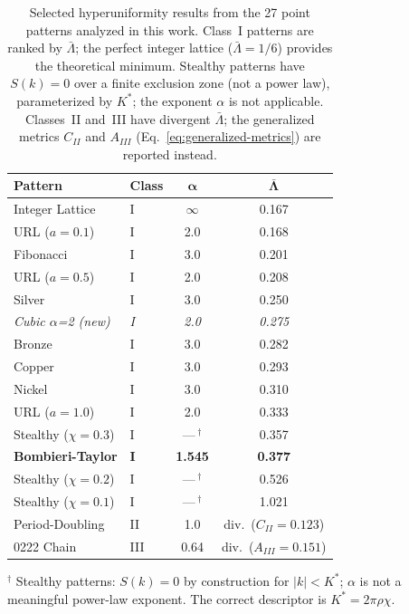 \documentclass[11pt]{article}
\begin{document}
\begin{table}[H]
  \centering
  \caption{Selected hyperuniformity results from the 27 point patterns analyzed in this work.
  Class~I patterns are ranked by $\bar{\Lambda}$; the perfect integer lattice ($\bar{\Lambda}
  = 1/6$) provides the theoretical minimum. Stealthy patterns have $S(k)=0$ over a finite
  exclusion zone (not a power law), parameterized by $K^*$; the exponent $\alpha$ is not
  applicable. Classes~II and~III have divergent $\bar{\Lambda}$; the generalized metrics
  $C_{II}$ and $A_{III}$ (Eq.~\ref{eq:generalized-metrics}) are reported instead.}
  \label{tab:catalog}
  \begin{tabular}{llcc}
    \toprule
    \textbf{Pattern} & \textbf{Class} & $\boldsymbol{\alpha}$ & $\boldsymbol{\bar{\Lambda}}$ \\
    \midrule
    Integer Lattice              & I   & $\infty$ & 0.167 \\
    URL ($a = 0.1$)              & I   & 2.0      & 0.168 \\
    Fibonacci                    & I   & 3.0      & 0.201 \\
    URL ($a = 0.5$)              & I   & 2.0      & 0.208 \\
    Silver                       & I   & 3.0      & 0.250 \\
    \textit{Cubic $\alpha$=2 (new)} & \textit{I} & \textit{2.0} & \textit{0.275} \\
    Bronze                       & I   & 3.0      & 0.282 \\
    Copper                       & I   & 3.0      & 0.293 \\
    Nickel                       & I   & 3.0      & 0.310 \\
    URL ($a = 1.0$)              & I   & 2.0      & 0.333 \\
    Stealthy ($\chi = 0.3$)      & I   & ---\,$^\dagger$ & 0.357 \\
    \textbf{Bombieri-Taylor}     & \textbf{I} & \textbf{1.545} & \textbf{0.377} \\
    Stealthy ($\chi = 0.2$)      & I   & ---\,$^\dagger$ & 0.526 \\
    Stealthy ($\chi = 0.1$)      & I   & ---\,$^\dagger$ & 1.021 \\
    \midrule
    Period-Doubling              & II  & 1.0      & div.\ ($C_{II} = 0.123$) \\
    \midrule
    0222 Chain                   & III & 0.64     & div.\ ($A_{III} = 0.151$) \\
    \bottomrule
  \end{tabular}
  \vspace{0.4em}

  $^\dagger$ Stealthy patterns: $S(k)=0$ by construction for $|k| < K^*$; $\alpha$ is not
  a meaningful power-law exponent. The correct descriptor is $K^* = 2\pi\rho\chi$.
\end{table}
\end{document}
